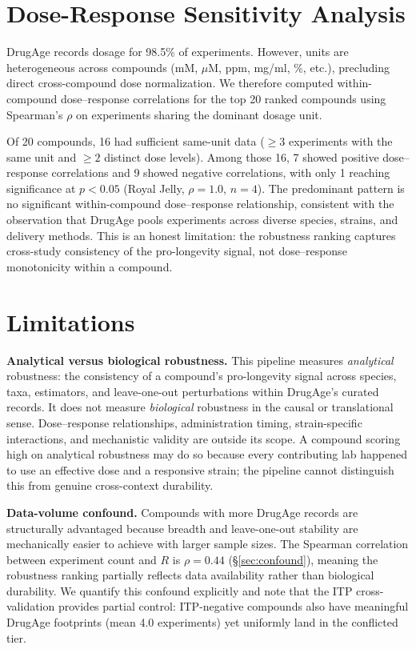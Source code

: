 \documentclass[11pt]{article}
\begin{document}
\section{Dose-Response Sensitivity Analysis}
\label{sec:dose}
DrugAge records dosage for 98.5\% of experiments. However, units are heterogeneous across compounds (mM, $\mu$M, ppm, mg/ml, \%, etc.), precluding direct cross-compound dose normalization. We therefore computed within-compound dose--response correlations for the top 20 ranked compounds using Spearman's $\rho$ on experiments sharing the dominant dosage unit.

Of 20 compounds, 16 had sufficient same-unit data ($\geq 3$ experiments with the same unit and $\geq 2$ distinct dose levels). Among those 16, 7 showed positive dose--response correlations and 9 showed negative correlations, with only 1 reaching significance at $p < 0.05$ (Royal Jelly, $\rho = 1.0$, $n = 4$). The predominant pattern is no significant within-compound dose--response relationship, consistent with the observation that DrugAge pools experiments across diverse species, strains, and delivery methods. This is an honest limitation: the robustness ranking captures cross-study consistency of the pro-longevity signal, not dose--response monotonicity within a compound.

\section{Limitations}

\textbf{Analytical versus biological robustness.} This pipeline measures \emph{analytical} robustness: the consistency of a compound's pro-longevity signal across species, taxa, estimators, and leave-one-out perturbations within DrugAge's curated records. It does not measure \emph{biological} robustness in the causal or translational sense. Dose--response relationships, administration timing, strain-specific interactions, and mechanistic validity are outside its scope. A compound scoring high on analytical robustness may do so because every contributing lab happened to use an effective dose and a responsive strain; the pipeline cannot distinguish this from genuine cross-context durability.

\textbf{Data-volume confound.} Compounds with more DrugAge records are structurally advantaged because breadth and leave-one-out stability are mechanically easier to achieve with larger sample sizes. The Spearman correlation between experiment count and $R$ is $\rho = 0.44$ (\S\ref{sec:confound}), meaning the robustness ranking partially reflects data availability rather than biological durability. We quantify this confound explicitly and note that the ITP cross-validation provides partial control: ITP-negative compounds also have meaningful DrugAge footprints (mean 4.0 experiments) yet uniformly land in the conflicted tier.
\end{document}
